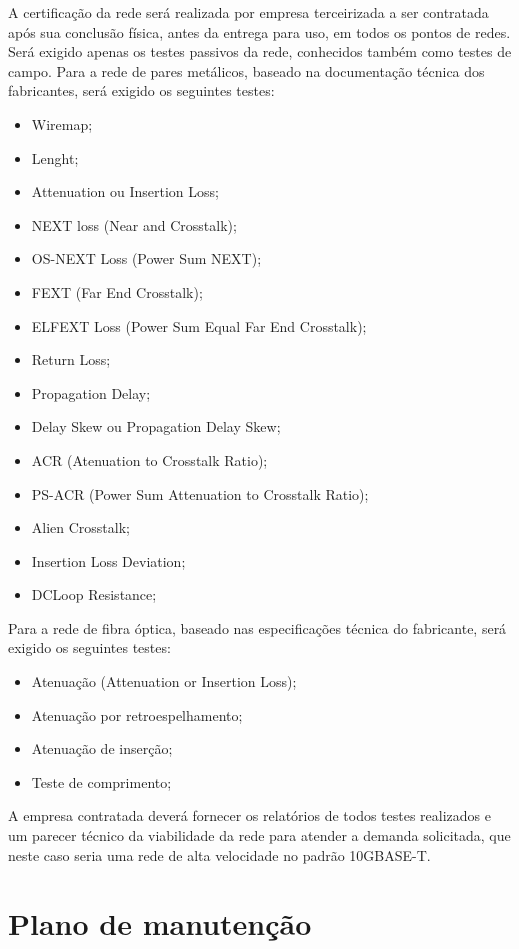 \documentclass[	DIV=calc,%
							paper=a4,%
							fontsize=12pt,%
							onecolumn]{scrartcl}	 					%
\begin{document}
A certificação da rede será realizada por empresa terceirizada a ser contratada após sua conclusão física, antes da entrega para uso, em todos os pontos de redes. Será exigido apenas os testes passivos da rede, conhecidos também como testes de campo. Para a rede de pares metálicos, baseado na documentação técnica dos fabricantes,  será exigido os seguintes testes:
\begin{itemize}	
	\item Wiremap;
	\item Lenght;
	\item Attenuation ou Insertion Loss;
	\item NEXT loss (Near and Crosstalk);
	\item OS-NEXT Loss (Power Sum NEXT);
	\item FEXT (Far End Crosstalk);
	\item ELFEXT Loss (Power Sum Equal Far End Crosstalk);
	\item Return Loss;
	\item Propagation Delay;
	\item Delay Skew ou Propagation Delay Skew;
	\item ACR (Atenuation to Crosstalk Ratio);
	\item PS-ACR (Power Sum Attenuation to Crosstalk Ratio);
	\item Alien Crosstalk;
	\item Insertion Loss Deviation;
	\item DCLoop Resistance;	
\end{itemize}

Para a rede de fibra óptica, baseado nas especificações técnica do fabricante, será exigido os seguintes testes:
\begin{itemize}	
	\item Atenuação (Attenuation or Insertion Loss);
	\item Atenuação por retroespelhamento;
	\item Atenuação de inserção;
	\item Teste de comprimento;
\end{itemize}

A empresa contratada deverá fornecer os relatórios de todos testes realizados e um parecer técnico da viabilidade da rede para atender a demanda solicitada, que neste caso seria uma rede de alta velocidade no padrão 10GBASE-T.


\section{Plano de manutenção}
\end{document}
